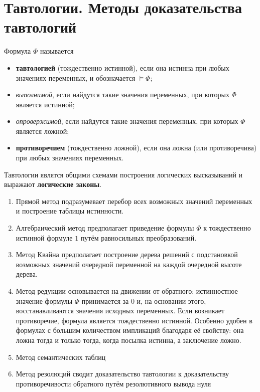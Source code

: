 \section{Тавтологии. Методы доказательства тавтологий}
\dftion Формула $\Phi$ называется
\begin{itemize}
    \item \textbf{тавтологией} (тождественно истинной), если она истинна при любых значениях переменных, и обозначается $\vDash \Phi$;
    \item \textit{выполнимой}, если найдутся такие значения переменных, при которых $\Phi$ является истинной;
    \item \textit{опровержимой}, если найдутся такие значения переменных, при которых $\Phi$ является ложной;
    \item \textbf{противоречием} (тождественно ложной), если она ложна (или противоречива) при любых значениях переменных.
\end{itemize}
\dftion Тавтологии являтся общими схемами построения логических высказываний и выражают \textbf{логические законы}.
\begin{enumerate}
    \item Прямой метод подразумевает перебор всех возможных значений переменных и построение таблицы истинности.
    \item Алгебраический метод предполагает приведение формулы $\Phi$ к тождественно истинной формуле $1$ путём равносильных преобразований.
    \item Метод Квайна предполагает построение дерева решений с подстановкой возможных значений очередной переменной на каждой очередной высоте дерева.
    \item Метод редукции основывается на движении от обратного: истинностное значение формулы $\Phi$ принимается за 0 и, на основании этого, восстанавливаются значения исходных переменных. Если возникает противоречие, формула является тождественно истинной. Особенно удобен в формулах с большим количеством импликаций благодаря её свойству: она ложна тогда и только тогда, когда посылка истинна, а заключение ложно.
    \item Метод семантических таблиц
    \item Метод резолюций сводит доказательство тавтологии к доказательству противоречивости обратного путём резолютивного вывода нуля
\end{enumerate}
